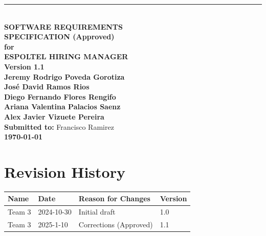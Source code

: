 \documentclass{scrreprt}
\date{November 14, 2024}
\def\myversion{1.1}
\begin{document}
\begin{titlepage}
    \begin{flushright}
        \rule{16cm}{1.5pt} \\[1cm]
        {\Huge\bfseries SOFTWARE REQUIREMENTS\\ SPECIFICATION (Approved)}\\[1cm]
        {\LARGE\bfseries for}\\[1cm]
        {\Huge\textbf{ESPOLTEL HIRING MANAGER}}\\[2cm]
        {\Large\textbf{Version \myversion}}\\[1.5cm]
        
        {\Large\textbf{Jeremy Rodrigo Poveda Gorotiza}\\
        \textbf{José David Ramos Rios}\\
        \textbf{Diego Fernando Flores Rengifo}\\
        \textbf{Ariana Valentina Palacios Saenz}\\
        \textbf{Alex Javier Vizuete Pereira}}\\[1.5cm]
        
        {\Large\textbf{Submitted to:} Francisco Ramirez}\\[1.5cm]
        {\Large\textbf{\today}}
    \end{flushright}
    \vfill
\end{titlepage}

\chapter*{Revision History}
\setcounter{page}{1}
\begin{center}
	\begin{tabular}{@{} l l p{6.5cm} l @{}}
		\toprule
		\textbf{Name}    & \textbf{Date}   & \textbf{Reason for Changes} & \textbf{Version} \\ 
		\midrule
		Team 3           & 2024-10-30      & Initial draft               & 1.0              \\
		Team 3           & 2025-1-10      & Corrections (Approved)              & 1.1              \\
		\bottomrule
	\end{tabular}
\end{center}

\tableofcontents

\listoffigures
\listoftables
\end{document}
